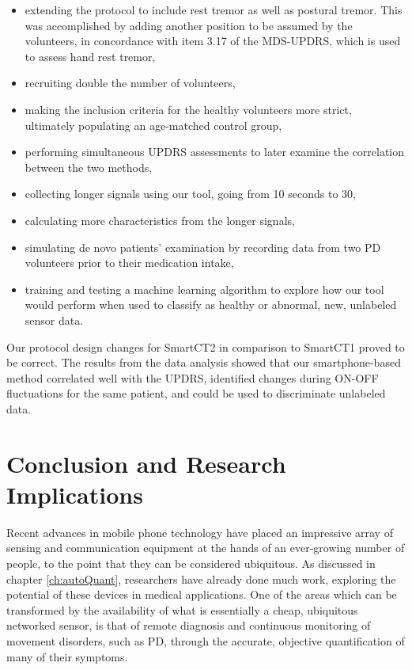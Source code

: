 \begin{itemize}
\item extending the protocol to include rest tremor as well as postural tremor. This was accomplished by adding another position to be assumed by the volunteers, in concordance with item 3.17 of the \gls{MDS}-\gls{UPDRS}, which is used to assess hand rest tremor,
\item recruiting double the number of volunteers,
\item making the inclusion criteria for the healthy volunteers more strict, ultimately populating an age-matched control group,
\item performing simultaneous \gls{UPDRS} assessments to later examine the correlation between the two methods,
\item collecting longer signals using our tool, going from 10 seconds to 30, 
\item calculating more characteristics from the longer signals,
\item simulating de novo patients' examination by recording data from two \gls{PD} volunteers prior to their medication intake,
\item training and testing a machine learning algorithm to explore how our tool would perform when used to classify as healthy or abnormal, new, unlabeled sensor data. 
\end{itemize}

\noindent
Our protocol design changes for \gls{SmartCT2} in comparison to \gls{SmartCT1} proved to be correct. The results from the data analysis showed that our smartphone-based method correlated well with the \gls{UPDRS}, identified changes during ON-OFF fluctuations for the same patient, and could be used to discriminate unlabeled data. 


\section{Conclusion and Research Implications}
\label{sec:SmartImplications}

Recent advances in mobile phone technology have placed an impressive array of sensing and communication equipment at the hands of an ever-growing number of people, to the point that they can be considered ubiquitous. As discussed in chapter \ref{ch:autoQuant}, researchers have already done much work, exploring the potential of these devices in medical applications. One of the areas which can be transformed by the availability of what is essentially a cheap, ubiquitous networked sensor, is that of remote diagnosis and continuous monitoring of movement disorders, such as \gls{PD}, through the accurate, objective quantification of many of their symptoms. 

